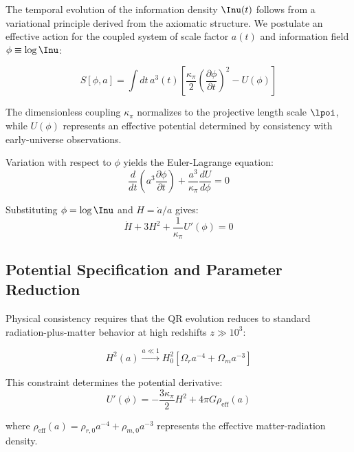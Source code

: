 The temporal evolution of the information density $\Inu(t)$ follows from a variational principle derived from the axiomatic structure. We postulate an effective action for the coupled system of scale factor $a(t)$ and information field $\phi \equiv \log \Inu$:

\begin{equation}
S[\phi, a] = \int dt \, a^3(t) \left[ \frac{\kappa_\pi}{2} \left(\frac{\partial \phi}{\partial t}\right)^2 - U(\phi) \right]
\label{eq:qr-action}
\end{equation}

The dimensionless coupling $\kappa_\pi$ normalizes to the projective length scale $\lpoi$, while $U(\phi)$ represents an effective potential determined by consistency with early-universe observations.

Variation with respect to $\phi$ yields the Euler-Lagrange equation:
\begin{equation}
\frac{d}{dt}\left(a^3 \frac{\partial \phi}{\partial t}\right) + \frac{a^3}{\kappa_\pi} \frac{dU}{d\phi} = 0
\label{eq:euler-lagrange}
\end{equation}

Substituting $\phi = \log \Inu$ and $H = \dot{a}/a$ gives:
\begin{equation}
\dot{H} + 3H^2 + \frac{1}{\kappa_\pi} U'(\phi) = 0
\label{eq:modified-friedmann}
\end{equation}

\subsection{Potential Specification and Parameter Reduction}
\label{subsec:potential-specification}

Physical consistency requires that the QR evolution reduces to standard radiation-plus-matter behavior at high redshifts $z \gg 10^3$:

\begin{equation}
H^2(a) \xrightarrow{a \ll 1} H_0^2 \left[ \Omega_r a^{-4} + \Omega_m a^{-3} \right]
\label{eq:high-z-limit}
\end{equation}

This constraint determines the potential derivative:
\begin{equation}
U'(\phi) = -\frac{3\kappa_\pi}{2} H^2 + 4\pi G \rho_{\text{eff}}(a)
\label{eq:potential-derivative}
\end{equation}

where $\rho_{\text{eff}}(a) = \rho_{r,0} a^{-4} + \rho_{m,0} a^{-3}$ represents the effective matter-radiation density.


